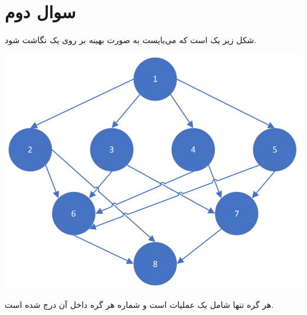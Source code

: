 \section{سوال دوم}


شکل زیر یک  است که می‌بایست به صورت بهینه بر روی یک  نگاشت شود.


\begin{center}
	\includegraphics*[width=0.5\linewidth]{pics/img1.png}
	\label{DFG سوال ۲}
\end{center}


هر گره تنها شامل یک عملیات است و شماره هر گره داخل آن درج شده است.

